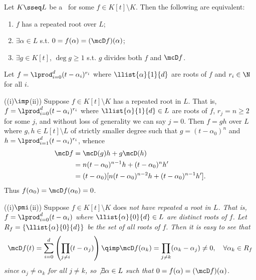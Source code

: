 \documentclass{article}
\begin{document}
\setcounter{section}{8} %
\begin{exercise} %
  Let \( K\sseq L \) be a \sfe~for some \( f\in K[t]\setminus K \).
  Then the following are equivalent: \begin{enumerate}[label=(\roman*)]
    \item \( f \) has a repeated root over \( L \);
    \item \( \exists \alpha\in L \) s.t. \( 0=f(\alpha)=(\mcD f)(\alpha) \);
    \item \( \exists g\in K[t] \), \( \deg g \geq 1 \) s.t. \( g \) divides both \( f \) and \( \mcD f \).
  \end{enumerate}
\end{exercise}
\begin{solution}
  Let \( f = \lprod_{i=0}^{d}(t-\alpha_i)^{r_i} \) where \( \llist{\alpha}{1}{d} \) are roots of \( f \) and \( r_i\in \N \) for all \( i \).

  ((i)\( \imp \)(ii)) Suppose \( f \in K[t]\setminus K \) has a repeated root in \( L \).
  That is, \( f = \lprod_{i=0}^{d}(t-\alpha_i)^{r_i} \) where \( \llist{\alpha}{1}{d} \in L \) are roots of \( f \), \( r_j = n \geq 2 \) for some \( j \), and without loss of generality we can say \( j=0 \).
  Then \( f=gh \) over \( L \) where \( g,h\in L[t]\setminus L \) of strictly smaller degree such that \( g=(t-\alpha_0)^n \) and \( h=\lprod_{i=1}^{d}(t-\alpha_i)^{r_i} \), whence
  \begin{align*}
  \mcD f &= \mcD(g)h + g\mcD(h)\\
         &= n(t-\alpha_0)^{n-1}h + (t-\alpha_0)^{n}h' \\
         &= (t-\alpha_0)[n(t-\alpha_0)^{n-2}h + (t-\alpha_0)^{n-1}h'].
  \end{align*}
  Thus \( f(\alpha_0) = \mcD f(\alpha_0) = 0 \).

  ((i)\( \pmi \)(ii)) Suppose \( f \in K[t]\setminus K \) does \it{not} have repeated a root in \( L \).
  That is, \( f = \lprod_{i=0}^{d}(t-\alpha_i) \) where \( \llist{\alpha}{0}{d} \in L \) are distinct roots of \( f \).
  Let \( R_f = \{\llist{\alpha}{0}{d}\} \) be the set of all roots of \( f \).
  Then it is easy to see that \begin{align*}
    \mcD f(t) = \sum_{i=0}^{d}\left(\prod_{j\neq i} (t-\alpha_j)\right) \qimp \mcD f(\alpha_k) = \prod_{j\neq k} (\alpha_k-\alpha_j) \neq 0, \quad\forall \alpha_k\in R_f
  \end{align*}
  since \( \alpha_j\neq \alpha_k \) for all \( j\neq k \), so \( \not\exists \alpha\in L \) such that \( 0=f(\alpha)=(\mcD f)(\alpha) \).


\end{solution}
\end{document}
